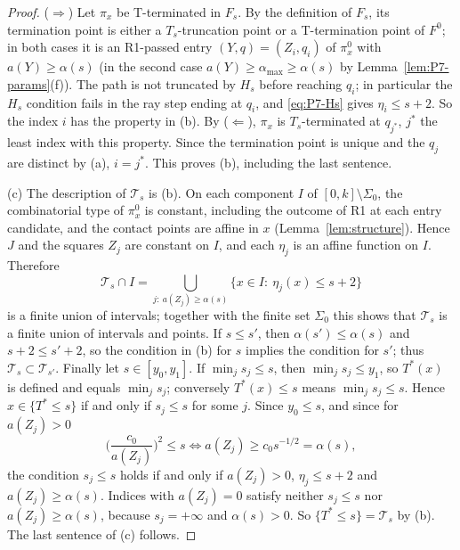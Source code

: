 \documentclass[11pt]{amsart}
\newcommand{\cT}{\mathcal T}
\newcommand{\amax}{\alpha_{\max}}
\newcommand{\Fz}{F^{0}}
\newcommand{\Fs}{F_{s}}
\newcommand{\Tstar}{T^{*}}
\theoremstyle{definition}
\theoremstyle{remark}
\numberwithin{equation}{section}
\begin{document}
\begin{proof}
($\Rightarrow$) Let $\pi_x$ be T-terminated in $\Fs$. By the definition of $\Fs$, its termination point is either a $T_s$-truncation point or a T-termination point of $\Fz$; in both cases it is an R1-passed entry $(Y,q)=(Z_i,q_i)$ of $\pi^0_x$ with $a(Y)\ge\alpha(s)$ (in the second case $a(Y)\ge\amax\ge\alpha(s)$ by Lemma~\ref{lem:P7-params}(f)). The path is not truncated by $H_s$ before reaching $q_i$; in particular the $H_s$ condition fails in the ray step ending at $q_i$, and \eqref{eq:P7-Hs} gives $\eta_i\le s+2$. So the index $i$ has the property in (b). By ($\Leftarrow$), $\pi_x$ is $T_s$-terminated at $q_{j^*}$, $j^*$ the least index with this property. Since the termination point is unique and the $q_j$ are distinct by (a), $i=j^*$. This proves (b), including the last sentence.

(c) The description of $\cT_s$ is (b). On each component $I$ of $[0,k]\setminus\Sigma_0$, the combinatorial type of $\pi^0_x$ is constant, including the outcome of R1 at each entry candidate, and the contact points are affine in $x$ (Lemma~\ref{lem:structure}). Hence $J$ and the squares $Z_j$ are constant on $I$, and each $\eta_j$ is an affine function on $I$. Therefore
\[
\cT_s\cap I=\bigcup_{j:\ a(Z_j)\ge\alpha(s)}\{x\in I:\ \eta_j(x)\le s+2\}
\]
is a finite union of intervals; together with the finite set $\Sigma_0$ this shows that $\cT_s$ is a finite union of intervals and points. If $s\le s'$, then $\alpha(s')\le\alpha(s)$ and $s+2\le s'+2$, so the condition in (b) for $s$ implies the condition for $s'$; thus $\cT_s\subset\cT_{s'}$. Finally let $s\in[y_0,y_1]$. If $\min_js_j\le s$, then $\min_js_j\le y_1$, so $\Tstar(x)$ is defined and equals $\min_js_j$; conversely $\Tstar(x)\le s$ means $\min_js_j\le s$. Hence $x\in\{\Tstar\le s\}$ if and only if $s_j\le s$ for some $j$. Since $y_0\le s$, and since for $a(Z_j)>0$
\[
\Big(\frac{c_0}{a(Z_j)}\Big)^2\le s\iff a(Z_j)\ge c_0s^{-1/2}=\alpha(s),
\]
the condition $s_j\le s$ holds if and only if $a(Z_j)>0$, $\eta_j\le s+2$ and $a(Z_j)\ge\alpha(s)$. Indices with $a(Z_j)=0$ satisfy neither $s_j\le s$ nor $a(Z_j)\ge\alpha(s)$, because $s_j=+\infty$ and $\alpha(s)>0$. So $\{\Tstar\le s\}=\cT_s$ by (b). The last sentence of (c) follows.


\end{proof}
\end{document}
